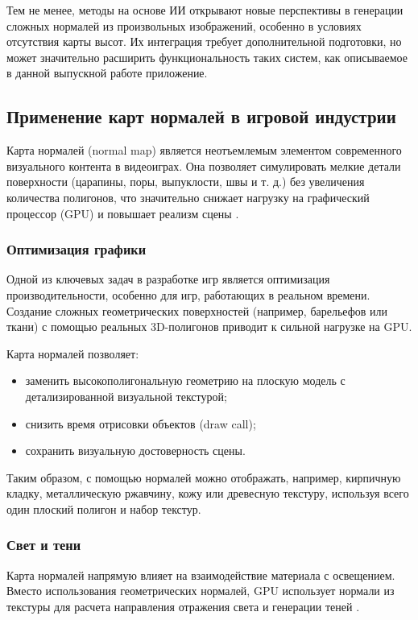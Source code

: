 Тем не менее, методы на основе ИИ открывают новые перспективы в генерации сложных нормалей из произвольных изображений, особенно в условиях отсутствия карты высот. Их интеграция требует дополнительной подготовки, но может значительно расширить функциональность таких систем, как описываемое в данной выпускной работе приложение.
\subsection{Применение карт нормалей в игровой индустрии}

Карта нормалей (normal map) является неотъемлемым элементом современного визуального контента в видеоиграх. Она позволяет симулировать мелкие детали поверхности (царапины, поры, выпуклости, швы и т. д.) без увеличения количества полигонов, что значительно снижает нагрузку на графический процессор (GPU) и повышает реализм сцены \cite{jehangiri2024}.
\subsubsection{Оптимизация графики}

Одной из ключевых задач в разработке игр является оптимизация производительности, особенно для игр, работающих в реальном времени. Создание сложных геометрических поверхностей (например, барельефов или ткани) с помощью реальных 3D-полигонов приводит к сильной нагрузке на GPU.

Карта нормалей позволяет: 
\begin{itemize}
	\item заменить высокополигональную геометрию на плоскую модель с детализированной визуальной текстурой;
	\item снизить время отрисовки объектов (draw call);
	\item сохранить визуальную достоверность сцены.
\end{itemize}

Таким образом, с помощью нормалей можно отображать, например, кирпичную кладку, металлическую ржавчину, кожу или древесную текстуру, используя всего один плоский полигон и набор текстур.
\subsubsection{Свет и тени}

Карта нормалей напрямую влияет на взаимодействие материала с освещением. Вместо использования геометрических нормалей, GPU использует нормали из текстуры для расчета направления отражения света и генерации теней \cite{farinella2020}.

